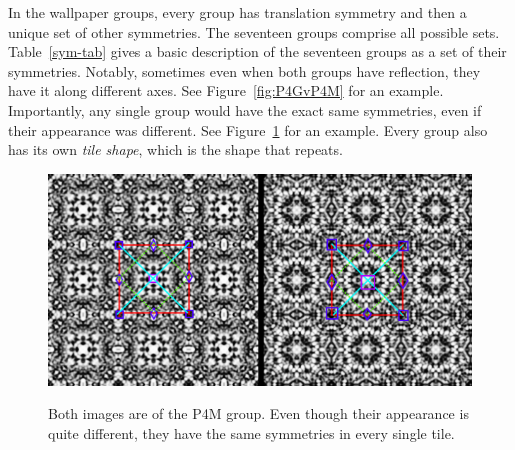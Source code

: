 In the wallpaper groups, every group has translation symmetry and then a unique set of other symmetries. The seventeen groups comprise all possible sets. Table~\ref{sym-tab} gives a basic description of the seventeen groups as a set of their symmetries. Notably, sometimes even when both groups have reflection, they have it along different axes. See Figure~\ref{fig:P4GvP4M} for an example. Importantly, any single group would have the exact same symmetries, even if their appearance was different. See Figure~\ref{P4MvP4M} for an example. Every group also has its own \textit{tile shape}, which is the shape that repeats.

\begin{figure}[!ht]
\centering
\includegraphics[width=0.9\columnwidth]{ann_images_same}
\label{P4MvP4M}
\caption{Both images are of the P4M group. Even though their appearance is quite different, they have the same symmetries in every single tile. }
\end{figure}

